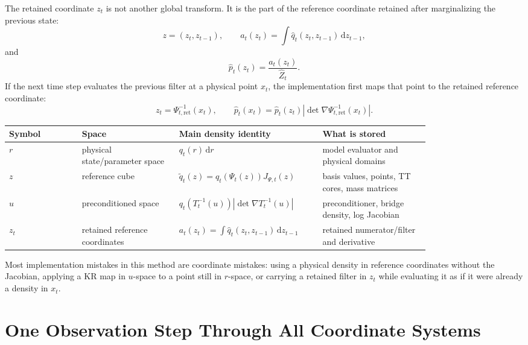 \documentclass[11pt]{article}
\numberwithin{equation}{section}
\newcommand{\dd}{\,\mathrm d}
\begin{document}
The retained coordinate \(z_t\) is not another global transform.  It is the
part of the reference coordinate retained after marginalizing the previous
state:
\begin{equation}
    z=(z_t,z_{t-1}),
    \qquad
    a_t(z_t)=\int \widehat q_t(z_t,z_{t-1})\dd z_{t-1},
    \label{eq:p24-coord-retained}
\end{equation}
and
\begin{equation}
    \widehat p_t(z_t)=\frac{a_t(z_t)}{\widehat Z_t}.
    \label{eq:p24-coord-retained-filter}
\end{equation}
If the next time step evaluates the previous filter at a physical point
\(x_t\), the implementation first maps that point to the retained reference
coordinate:
\begin{equation}
    z_t=\Psi_{t,\mathrm{ret}}^{-1}(x_t),
    \qquad
    \widehat p_t(x_t)=
    \widehat p_t(z_t)
    \left|\det\nabla\Psi_{t,\mathrm{ret}}^{-1}(x_t)\right|.
    \label{eq:p24-coord-retained-physical}
\end{equation}

\begin{center}
\begin{tabular}{p{0.15\linewidth}p{0.20\linewidth}p{0.24\linewidth}p{0.22\linewidth}}
\toprule
Symbol & Space & Main density identity & What is stored\\
\midrule
\(r\) & physical state/parameter space &
\(q_t(r)\dd r\) &
model evaluator and physical domains\\
\(z\) & reference cube &
\(\widetilde q_t(z)=q_t(\Psi_t(z))J_{\Psi,t}(z)\) &
basis values, points, TT cores, mass matrices\\
\(u\) & preconditioned space &
\(q_t(T_t^{-1}(u))|\det\nabla T_t^{-1}(u)|\) &
preconditioner, bridge density, log Jacobian\\
\(z_t\) & retained reference coordinates &
\(a_t(z_t)=\int\widehat q_t(z_t,z_{t-1})\dd z_{t-1}\) &
retained numerator/filter and derivative\\
\bottomrule
\end{tabular}
\end{center}

Most implementation mistakes in this method are coordinate mistakes: using a
physical density in reference coordinates without the Jacobian, applying a KR
map in \(u\)-space to a point still in \(r\)-space, or carrying a retained
filter in \(z_t\) while evaluating it as if it were already a density in
\(x_t\).

\section{One Observation Step Through All Coordinate Systems}
\end{document}
